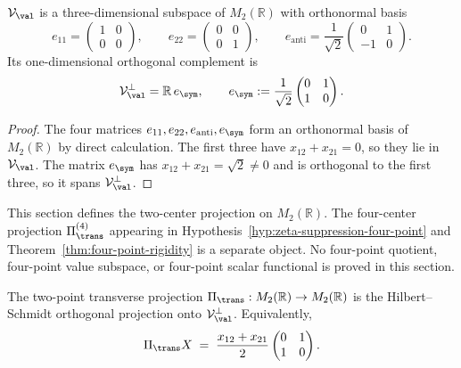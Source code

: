 \begin{lemma}
\label{lem:value-subspace-explicit-basis}
\(\mathcal V_\val\) is a three-dimensional subspace of
\(M_2(\mathbb R)\) with orthonormal basis
\begin{equation}
\label{eq:V-val-basis}
        e_{11}=\begin{pmatrix}1&0\\0&0\end{pmatrix},
        \qquad
        e_{22}=\begin{pmatrix}0&0\\0&1\end{pmatrix},
        \qquad
        e_{\mathrm{anti}}=\frac1{\sqrt2}
        \begin{pmatrix}0&1\\-1&0\end{pmatrix}.
\end{equation}
Its one-dimensional orthogonal complement is
\begin{equation}
\label{eq:V-val-perp-basis}
        \mathcal V_\val^\perp=\mathbb R\,e_\sym,
        \qquad
        e_\sym:=\frac1{\sqrt2}
        \begin{pmatrix}0&1\\1&0\end{pmatrix}.
\end{equation}
\end{lemma}

\begin{proof}
The four matrices \(e_{11},e_{22},e_{\mathrm{anti}},e_\sym\) form an
orthonormal basis of \(M_2(\mathbb R)\) by direct calculation.  The
first three have \(x_{12}+x_{21}=0\), so they lie in
\(\mathcal V_\val\).  The matrix \(e_\sym\) has
\(x_{12}+x_{21}=\sqrt2\ne 0\) and is orthogonal to the first three, so
it spans \(\mathcal V_\val^\perp\).
\end{proof}

\begin{remark}
\label{rem:transverse-projection-four-point-not-supplied}
This section defines the two-center projection on \(M_2(\mathbb R)\).
The four-center projection \(\Pi_\trans^{(4)}\) appearing in
Hypothesis~\ref{hyp:zeta-suppression-four-point} and
Theorem~\ref{thm:four-point-rigidity} is a separate object.  No
four-point quotient, four-point value subspace, or four-point scalar
functional is proved in this section.
\end{remark}

\begin{definition}
\label{def:two-point-transverse-projection}
The two-point transverse projection
\(\Pi_\trans:M_2(\mathbb R)\to M_2(\mathbb R)\) is the
Hilbert--Schmidt orthogonal projection onto
\(\mathcal V_\val^\perp\).  Equivalently,
\begin{equation}
\label{eq:Pi-trans-explicit}
        \Pi_\trans X
        \;=\;\frac{x_{12}+x_{21}}{2}
        \begin{pmatrix}0&1\\1&0\end{pmatrix}.
\end{equation}
\end{definition}

